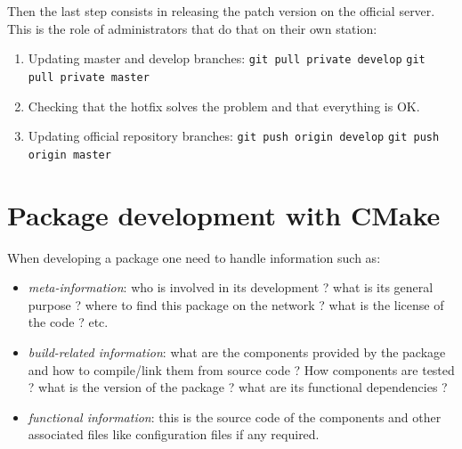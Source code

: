 \documentclass[12pt,a4paper]{article}
\begin{document}
Then the last step consists in releasing the patch version on the official server. This is the role of administrators that do that on their own station:
\begin{enumerate}
\item Updating master and develop branches:
\linebreak \verb|git pull private develop|
\linebreak \verb|git pull private master|
\item Checking that the hotfix solves the problem and that everything is OK.
\item Updating official repository branches:
\linebreak \verb|git push origin develop|
\linebreak \verb|git push origin master|
\end{enumerate}

\pagebreak

\section{Package development with CMake}
\label{sec:useCMake}

When developing a package one need to handle information such as:
\begin{itemize}
\item \textit{meta-information}: who is involved in its development ? what is its general purpose ? where to find this package on the network ? what is the license of the code ? etc.
\item \textit{build-related information}: what are the components provided by the package and how to compile/link them from source code ?  How components are tested ? what is the version of the package ? what are its functional dependencies ?
\item \textit{functional information}: this is the source code of the components and other associated files like configuration files if any required.
\end{itemize}
\end{document}
